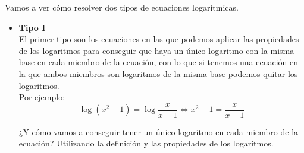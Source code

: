 \documentclass[a4paper,11pt,answers]{exam}
\begin{document}
Vamos a ver cómo resolver dos tipos de ecuaciones logarítmicas.
\begin{itemize}
\item \large{\textbf{Tipo I}}\\
  El primer tipo son los ecuaciones en las que podemos aplicar las propiedades de los logaritmos
  para conseguir que haya un único logaritmo con la misma base en cada miembro de la ecuación,
  con lo que si tenemos una ecuación en la que ambos miembros son logaritmos de la misma base
  podemos quitar los logaritmos.\\
  Por ejemplo:
  \[\log (x^2 - 1) = \log \frac{x}{x-1} \Leftrightarrow x^2 - 1 = \frac{x}{x-1}\]

  ¿Y cómo vamos a conseguir tener un único logaritmo en cada miembro de la ecuación? Utilizando la
  definición y las propiedades de los logaritmos.\\


\end{itemize}
\end{document}
